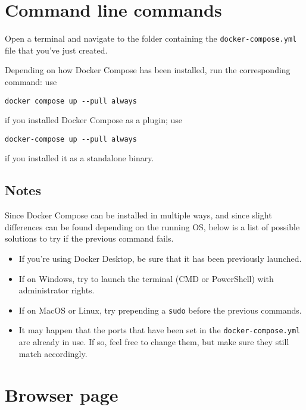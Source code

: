 \section{Command line commands}

Open a terminal and navigate to the folder containing the \verb|docker-compose.yml| file that you've just created.

Depending on how Docker Compose has been installed, run the corresponding command: use

\begin{center}
\verb|docker compose up --pull always|
\end{center}

if you installed Docker Compose as a plugin; use

\begin{center}
\verb|docker-compose up --pull always|
\end{center}

if you installed it as a standalone binary.

\subsection{Notes}

Since Docker Compose can be installed in multiple ways, and since slight differences can be found depending on the running OS, below is a list of possible solutions to try if the previous command fails.

\begin{itemize}

    \item If you're using Docker Desktop, be sure that it has been previously launched.
    \item If on Windows, try to launch the terminal (CMD or PowerShell) with administrator rights.
    \item If on MacOS or Linux, try prepending a \verb|sudo| before the previous commands.
    \item It may happen that the ports that have been set in the \verb|docker-compose.yml| are already in use.
    If so, feel free to change them, but make sure they still match accordingly.

\end{itemize}

\section{Browser page}

